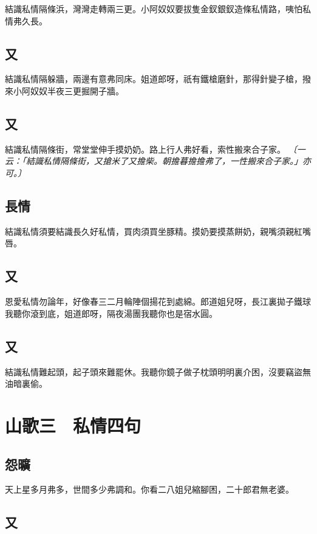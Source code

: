 結識私情隔條浜，灣灣走轉兩三更。小阿奴奴要拔隻金釵銀釵造條私情路，咦怕私情弗久長。

\subsection*{又}

結識私情隔躲牆，兩邊有意弗同床。姐道郎呀，祇有鐵槍磨針，那得針變子槍，撥來小阿奴奴半夜三更掘開子牆。

\subsection*{又}

結識私情隔條街，常堂堂伸手摸奶奶。路上行人弗好看，索性搬來合子家。
\textit{〔一云：「結識私情隔條街，又搶米了又擔柴。朝擔暮擔擔弗了，一性搬來合子家。」亦可。〕}

\subsection*{長情}

結識私情須要結識長久好私情，買肉須買坐豚精。摸奶要摸蒸餅奶，親嘴須親紅嘴唇。

\subsection*{又}

恩愛私情勿論年，好像春三二月輪陣個揚花到處綿。郎道姐兒呀，長江裏拋子鐵球我聽你滾到底，姐道郎呀，隔夜湯團我聽你也是宿水圓。

\subsection*{又}

結識私情難起頭，起子頭來難罷休。我聽你鏡子做子枕頭明明裏介困，沒要竊盜無油暗裏偷。


\section*{山歌三　私情四句}
\subsection*{怨曠}

天上星多月弗多，世間多少弗調和。你看二八姐兒縮腳困，二十郎君無老婆。

\subsection*{又}

